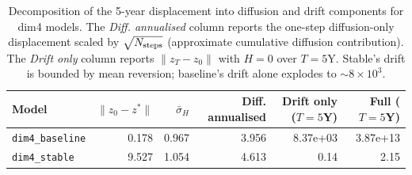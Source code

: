 \begin{table}[H]
\centering
\caption{Decomposition of the 5-year displacement into diffusion and drift components for dim4 models. The \emph{Diff. annualised} column reports the one-step diffusion-only displacement scaled by $\sqrt{N_{\rm steps}}$ (approximate cumulative diffusion contribution). The \emph{Drift only} column reports $\|z_T - z_0\|$ with $H=0$ over $T = 5$Y. Stable's drift is bounded by mean reversion; baseline's drift alone explodes to $\sim 8\times 10^3$.}
\label{tab:hk_decomposition}
\small
\begin{tabular}{lrrrrr}
\toprule
Model & $\|z_0 - z^*\|$ & $\bar{\sigma}_H$ & Diff. annualised & Drift only ($T=5$Y) & Full ($T=5$Y) \\
\midrule
\texttt{dim4\_baseline} & 0.178 & 0.967 & 3.956 & 8.37e+03 & 3.87e+13 \\
\texttt{dim4\_stable} & 9.527 & 1.054 & 4.613 & 0.14 & 2.15 \\
\bottomrule
\end{tabular}
\end{table}